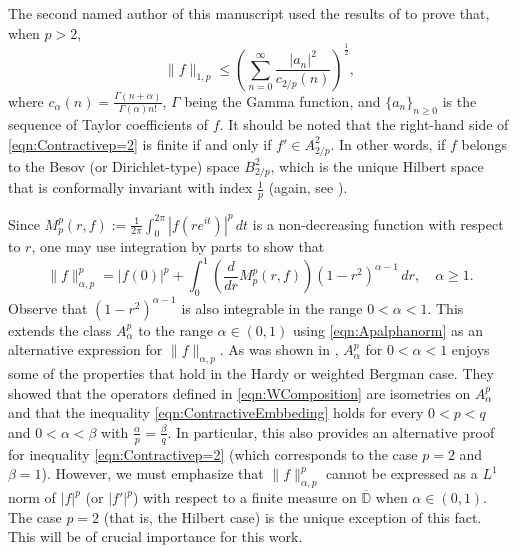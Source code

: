 \documentclass[12pt]{amsart}
\theoremstyle{definition}
\newcommand{\D}{\mathbb{{D}}}
\numberwithin{equation}{section}
\begin{document}
            The second named author of this manuscript \cite{MR4705691} used the results of \cite{MR4472587} to prove that, when $p > 2$,
            \begin{equation} \label{eqn:Contractivep=2}
                \| f \|_{1, p} \leq \left( \sum_{n = 0}^\infty \dfrac{|a_n|^2}{c_{2/p} (n)} \right)^\frac{1}{2},
            \end{equation}
            where $c_{\alpha}(n) = \frac{\Gamma (n + \alpha)}{\Gamma(\alpha) n!}$, $\Gamma$ being the Gamma function, and $\{ a_n \}_{n \geq 0}$ is the sequence of Taylor coefficients of $f$. It should be noted that the right-hand side of \eqref{eqn:Contractivep=2} is finite if and only if $f' \in A^2_{2/p}$. In other words, if $f$ belongs to the Besov (or Dirichlet-type) space $B^2_{2/p}$, which is the unique Hilbert space that is conformally invariant with index $\frac{1}{p}$ (again, see \cite{AM21}).

        Since $M_p^p (r,f) := \frac{1}{2\pi} \int_{0}^{2\pi} |f(re^{it})|^p \, dt$ is a non-decreasing function with respect to $r$, one may use integration by parts to show that
            \begin{equation} \label{eqn:Apalphanorm}
                \| f \|_{\alpha, p}^p = |f(0)|^p + \int_0^1 \left(\dfrac{d}{dr} M_p^p (r,f) \right) (1 - r^2)^{\alpha - 1} \, dr, \quad \alpha \geq 1.
            \end{equation}
            Observe that $(1 - r^2)^{\alpha - 1}$ is also integrable in the range $0 < \alpha < 1$. This extends the class $A^p_\alpha$ to the range $\alpha \in (0,1)$ using \eqref{eqn:Apalphanorm} as an alternative expression for $\| f \|_{\alpha,p}$. As was shown in \cite{brevig2025contractivehardylittlewoodinequalitiesdirichlet}, $A^p_\alpha$ for $0 < \alpha < 1$ enjoys some of the properties that hold in the Hardy or weighted Bergman case. They showed that the operators defined in \eqref{eqn:WComposition} are isometries on $A^p_\alpha$ and that the inequality \eqref{eqn:ContractiveEmbbeding} holds for every $0 < p < q$ and $0 < \alpha < \beta$ with $\frac{\alpha}{p} = \frac{\beta}{q}$. In particular, this also provides an alternative proof for inequality \eqref{eqn:Contractivep=2} (which corresponds to the case $p = 2$ and $\beta = 1$). However, we must emphasize that $\| f \|_{\alpha, p}^p$ cannot be expressed as a $L^1$ norm of $|f|^p$ (or $|f'|^p$) with respect to a finite measure on $\overline{\D}$ when $\alpha \in (0,1)$. The case $p = 2$ (that is, the Hilbert case) is the unique exception of this fact. This will be of crucial importance for this work.
            
\end{document}
